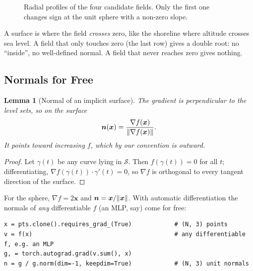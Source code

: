 \documentclass[11pt,a4paper]{article}
\newcommand{\Surf}{\mathcal{S}}
\newcommand{\vx}{\bm{x}}
\newcommand{\vn}{\bm{n}}
\theoremstyle{definition}
\theoremstyle{plain}
\newtheorem{lemma}[definition]{Lemma}
\theoremstyle{remark}
\begin{document}
\begin{figure}[ht]
\centering
{}
\caption{Radial profiles of the four candidate fields. Only the first one changes sign at the unit sphere with a non-zero slope.}
\end{figure}

\begin{intuition}
A surface is where the field \emph{crosses} zero, like the shoreline where altitude crosses sea level. A field that only touches zero (the last row) gives a double root: no ``inside'', no well-defined normal. A field that never reaches zero gives nothing.
\end{intuition}

\subsection{Normals for Free }
\begin{lemma}[Normal of an implicit surface]
The gradient is perpendicular to the level sets, so on the surface
\[
\vn(\vx)=\frac{\nabla f(\vx)}{\norm{\nabla f(\vx)}}.
\]
It points toward increasing $f$, which by our convention is \emph{outward}.
\end{lemma}
\begin{proof}
Let $\gamma(t)$ be any curve lying in $\Surf$. Then $f(\gamma(t))=0$ for all $t$; differentiating, $\nabla f(\gamma(t))\cdot\gamma'(t)=0$, so $\nabla f$ is orthogonal to every tangent direction of the surface.
\end{proof}

For the sphere, $\nabla f=2\vx$ and $\vn=\vx/\norm{\vx}$. With automatic differentiation the normals of \emph{any} differentiable $f$ (an MLP, say) come for free:
\begin{lstlisting}
x = pts.clone().requires_grad_(True)            # (N, 3) points
v = f(x)                                        # any differentiable f, e.g. an MLP
g, = torch.autograd.grad(v.sum(), x)
n = g / g.norm(dim=-1, keepdim=True)            # (N, 3) unit normals
\end{lstlisting}
\end{document}
